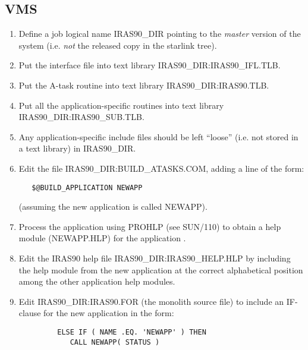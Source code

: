 \subsection{VMS}
\begin{enumerate}
\item Define a job logical name {\small IRAS90\_DIR} pointing to the
{\em master} version of the system (i.e. {\em not} the
released copy in the starlink tree).

\item Put the interface file into text library {\small
IRAS90\_DIR:IRAS90\_IFL.TLB}.

\item Put the A-task routine into text library {\small IRAS90\_DIR:IRAS90.TLB}.

\item Put all the application-specific routines into text library
{\small IRAS90\_DIR:IRAS90\_SUB.TLB}.

\item Any application-specific include files should be left ``loose'' (i.e. not
stored in a text library) in {\small IRAS90\_DIR}.

\item Edit the file {\small IRAS90\_DIR:BUILD\_ATASKS.COM}, adding a line of the
form:

\small
\begin{verbatim}
   $@BUILD_APPLICATION NEWAPP
\end{verbatim}
\normalsize

(assuming the new application is called {\small NEWAPP}).

\item Process the application using {\small PROHLP} (see SUN/110) to obtain
a help module ({\small NEWAPP.HLP}) for the application .

\item Edit the {\small IRAS90} help file {\small IRAS90\_DIR:IRAS90\_HELP.HLP}
by including the help module from the new application
at the correct alphabetical position among the other application help modules.

\item Edit {\small IRAS90\_DIR:IRAS90.FOR} (the monolith source file) to
include an IF-clause for the new application in the form:

\small
\begin{verbatim}
         ELSE IF ( NAME .EQ. 'NEWAPP' ) THEN
            CALL NEWAPP( STATUS )
\end{verbatim}
\normalsize


\end{enumerate}
